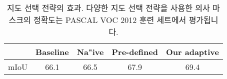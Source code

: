 \begin{table}[]
\centering

{\small
\begin{tabular}{@{}ccccc@{}}
\toprule
                            & Baseline  & Na"ive   & Pre-defined   & Our adaptive \\ \midrule
\multicolumn{1}{l}{mIoU}    &66.1       & 66.5      & 67.9          & 69.4   \\ \bottomrule
\end{tabular}
}
\vspace{2mm}
\caption{지도 선택 전략의 효과. 다양한 지도 선택 전략을 사용한 의사 마스크의 정확도는 PASCAL VOC 2012 훈련 세트에서 평가됩니다.} \vspace{-2mm}
\label{tab:strategy}
\end{table}
